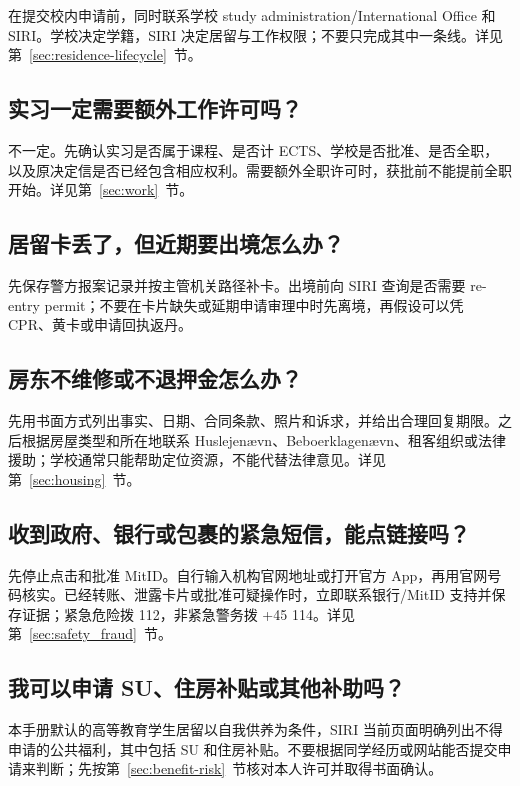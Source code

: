 在提交校内申请前，同时联系学校 study administration/International Office 和 SIRI。学校决定学籍，SIRI 决定居留与工作权限；不要只完成其中一条线。详见第~\ref{sec:residence-lifecycle}~节。

\subsection*{实习一定需要额外工作许可吗？}

不一定。先确认实习是否属于课程、是否计 ECTS、学校是否批准、是否全职，以及原决定信是否已经包含相应权利。需要额外全职许可时，获批前不能提前全职开始。详见第~\ref{sec:work}~节。

\subsection*{居留卡丢了，但近期要出境怎么办？}

先保存警方报案记录并按主管机关路径补卡。出境前向 SIRI 查询是否需要 re-entry permit；不要在卡片缺失或延期申请审理中时先离境，再假设可以凭 CPR、黄卡或申请回执返丹。

\subsection*{房东不维修或不退押金怎么办？}

先用书面方式列出事实、日期、合同条款、照片和诉求，并给出合理回复期限。之后根据房屋类型和所在地联系 Huslejenævn、Beboerklagenævn、租客组织或法律援助；学校通常只能帮助定位资源，不能代替法律意见。详见第~\ref{sec:housing}~节。

\subsection*{收到政府、银行或包裹的紧急短信，能点链接吗？}

先停止点击和批准 MitID。自行输入机构官网地址或打开官方 App，再用官网号码核实。已经转账、泄露卡片或批准可疑操作时，立即联系银行/MitID 支持并保存证据；紧急危险拨 112，非紧急警务拨 +45 114。详见第~\ref{sec:safety_fraud}~节。

\subsection*{我可以申请 SU、住房补贴或其他补助吗？}

本手册默认的高等教育学生居留以自我供养为条件，SIRI 当前页面明确列出不得申请的公共福利，其中包括 SU 和住房补贴。不要根据同学经历或网站能否提交申请来判断；先按第~\ref{sec:benefit-risk}~节核对本人许可并取得书面确认。
